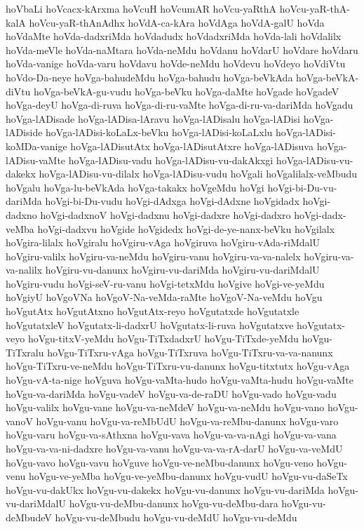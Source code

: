 {hoVbaLi
hoVcacx-kArxma
hoVcuH
hoVcumAR
hoVcu-yaRthA
hoVcu-yaR-thA-kalA
hoVcu-yaR-thAnAdhx
hoVdA-ca-kAra
hoVdAga
hoVdA-galU
hoVda
hoVdaMte
hoVda-dadxriMda
hoVdadudx
hoVdadxriMda
hoVda-lali
hoVdalilx
hoVda-meVle
hoVda-naMtara
hoVda-neMdu
hoVdanu
hoVdarU
hoVdare
hoVdaru
hoVda-vanige
hoVda-varu
hoVdavu
hoVde-neMdu
hoVdevu
hoVdeyo
hoVdiVtu
hoVdo-Da-neye
hoVga-bahudeMdu
hoVga-bahudu
hoVga-beVkAda
hoVga-beVkA-diVtu
hoVga-beVkA-gu-vudu
hoVga-beVku
hoVga-daMte
hoVgade
hoVgadeV
hoVga-deyU
hoVga-di-ruva
hoVga-di-ru-vaMte
hoVga-di-ru-va-dariMda
hoVgadu
hoVga-lADisade
hoVga-lADisa-lAravu
hoVga-lADisalu
hoVga-lADisi
hoVga-lADiside
hoVga-lADisi-koLaLx-beVku
hoVga-lADisi-koLaLxlu
hoVga-lADisi-koMDa-vanige
hoVga-lADisutAtx
hoVga-lADisutAtxre
hoVga-lADisuva
hoVga-lADisu-vaMte
hoVga-lADisu-vadu
hoVga-lADisu-vu-dakAkxgi
hoVga-lADisu-vu-dakekx
hoVga-lADisu-vu-dilalx
hoVga-lADisu-vudu
hoVgali
hoVgalilalx-veMbudu
hoVgalu
hoVga-lu-beVkAda
hoVga-takakx
hoVgeMdu
hoVgi
hoVgi-bi-Du-vu-dariMda
hoVgi-bi-Du-vudu
hoVgi-dAdxga
hoVgi-dAdxne
hoVgidadx
hoVgi-dadxno
hoVgi-dadxnoV
hoVgi-dadxnu
hoVgi-dadxre
hoVgi-dadxro
hoVgi-dadx-veMba
hoVgi-dadxvu
hoVgide
hoVgidedx
hoVgi-de-ye-nanx-beVku
hoVgilalx
hoVgira-lilalx
hoVgiralu
hoVgiru-vAga
hoVgiruva
hoVgiru-vAda-riMdalU
hoVgiru-valilx
hoVgiru-va-neMdu
hoVgiru-vanu
hoVgiru-va-va-nalelx
hoVgiru-va-va-nalilx
hoVgiru-vu-danunx
hoVgiru-vu-dariMda
hoVgiru-vu-dariMdalU
hoVgiru-vudu
hoVgi-seV-ru-vanu
hoVgi-tetxMdu
hoVgive
hoVgi-ve-yeMdu
hoVgiyU
hoVgoVNa
hoVgoV-Na-veMda-raMte
hoVgoV-Na-veMdu
hoVgu
hoVgutAtx
hoVgutAtxno
hoVgutAtx-reyo
hoVgutatxde
hoVgutatxle
hoVgutatxleV
hoVgutatx-li-dadxrU
hoVgutatx-li-ruva
hoVgutatxve
hoVgutatx-veyo
hoVgu-titxV-yeMdu
hoVgu-TiTxdadxrU
hoVgu-TiTxde-yeMdu
hoVgu-TiTxralu
hoVgu-TiTxru-vAga
hoVgu-TiTxruva
hoVgu-TiTxru-va-va-nanunx
hoVgu-TiTxru-ve-neMdu
hoVgu-TiTxru-vu-danunx
hoVgu-titxtutx
hoVgu-vAga
hoVgu-vA-ta-nige
hoVguva
hoVgu-vaMta-hudo
hoVgu-vaMta-hudu
hoVgu-vaMte
hoVgu-va-dariMda
hoVgu-vadeV
hoVgu-va-de-raDU
hoVgu-vado
hoVgu-vadu
hoVgu-valilx
hoVgu-vane
hoVgu-va-neMdeV
hoVgu-va-neMdu
hoVgu-vano
hoVgu-vanoV
hoVgu-vanu
hoVgu-va-reMbUdU
hoVgu-va-reMbu-danunx
hoVgu-varo
hoVgu-varu
hoVgu-va-sAthxna
hoVgu-vava
hoVgu-va-va-nAgi
hoVgu-va-vana
hoVgu-va-va-ni-dadxre
hoVgu-va-vanu
hoVgu-va-va-rA-darU
hoVgu-va-veMdU
hoVgu-vavo
hoVgu-vavu
hoVguve
hoVgu-ve-neMbu-danunx
hoVgu-veno
hoVgu-venu
hoVgu-ve-yeMba
hoVgu-ve-yeMbu-danunx
hoVgu-vudU
hoVgu-vu-daSeTx
hoVgu-vu-dakUkx
hoVgu-vu-dakekx
hoVgu-vu-danunx
hoVgu-vu-dariMda
hoVgu-vu-dariMdalU
hoVgu-vu-deMbu-danunx
hoVgu-vu-deMbu-dara
hoVgu-vu-deMbudeV
hoVgu-vu-deMbudu
hoVgu-vu-deMdU
hoVgu-vu-deMdu
}
